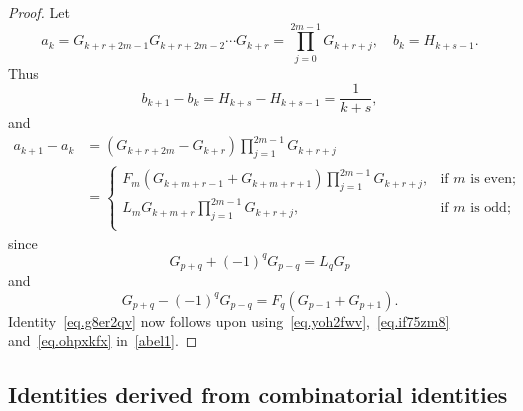 \documentclass[12pt,reqno]{article}
\begin{document}
	\begin{proof}
		Let
		\begin{equation}\label{eq.yoh2fwv}
			a_k  = G_{k + r + 2m - 1} G_{k + r + 2m - 2}  \cdots G_{k + r}  = \prod_{j = 0}^{2m - 1} {G_{k + r + j} },\quad b_k=H_{k+s-1}.
		\end{equation}
		Thus
		\begin{equation}\label{eq.if75zm8}
			b_{k + 1}  - b_k  = H_{k + s}  - H_{k + s - 1} = \frac{1}{{k + s}},
		\end{equation}
		and
		\begin{equation}\label{eq.ohpxkfx}
			\begin{split}
				a_{k + 1} - a_k&=\left( {G_{k + r + 2m} - G_{k + r} } \right)\prod_{j = 1}^{2m - 1} {G_{k + r + j} }\\
				&=\begin{cases}
					F_m \left( {G_{k + m + r - 1} + G_{k + m + r + 1} } \right)\prod_{j = 1}^{2m - 1} {G_{k + r + j} } ,&\text{if $m$ is even;}  \\
					L_m G_{k + m + r} \prod_{j = 1}^{2m - 1} {G_{k + r + j} } ,&\text{if $m$ is odd;}  \\
				\end{cases}
			\end{split}
		\end{equation}
		since
		\begin{equation*}
			G_{p + q} + (- 1)^q G_{p - q} = L_q G_p
		\end{equation*}
		and
		\begin{equation*}
			G_{p + q} - (- 1)^q G_{p - q} = F_q \left( G_{p - 1} + G_{p + 1} \right).
		\end{equation*}
		Identity~\eqref{eq.g8er2qv} now follows upon using~\eqref{eq.yoh2fwv},~\eqref{eq.if75zm8} and~\eqref{eq.ohpxkfx} in~\eqref{abel1}.
	\end{proof}
	
	
	\subsection{Identities derived from combinatorial identities}
	
\end{document}

